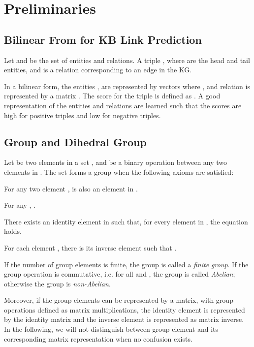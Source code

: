 \documentclass[11pt,a4paper]{article}
\begin{document}
%
 \section{Preliminaries}\label{sec:preliminary}



\subsection{Bilinear From for KB Link Prediction} \label{subsec:bilinear}

Let  and  be the set of entities and relations. A triple , where  are the head and tail entities, and  is a relation corresponding to an edge in the KG. 

In a bilinear form, the entities ,  are represented by vectors  where , and relation  is represented by a matrix . The score for the triple is defined as . A good representation of the entities and relations are learned such that the scores are high for positive triples and low for negative triples.






\subsection{Group and Dihedral Group}


Let  be two elements in a set , and  be a binary operation  between any two elements  in  . The set  forms a group when the following axioms are satisfied:
\begin{description}[leftmargin=0cm]
\item[Closure] For any two element ,  is also an element in .
\item[Associativity] For any , .
\item[Identity] There exists an identity element  in  such that, for every element  in , the equation  holds.
\item[Inverse] For each element , there is its inverse element  such that .
\end{description}
If the number of group elements is finite, the group is called a \textit{finite group}. If the group operation is commutative, i.e.  for all  and , the group is called \textit{Abelian}; otherwise the group is \textit{non-Abelian}. 



Moreover, if the group elements can be represented by a matrix, with group operations defined as matrix multiplications, the identity element is represented by the identity matrix and the inverse element is represented as matrix inverse. In the following, we will not distinguish between group element and its corresponding matrix representation when no confusion exists.
\end{document}
